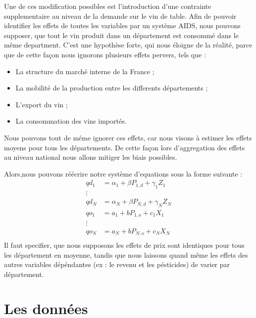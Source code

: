 \documentclass[11pt,]{article}
\begin{document}
\par

Une de ces modification possibles est l'introduction d'une contrainte
supplementaire au niveau de la demande sur le vin de table. Afin de
pouvoir identifier les effets de toutes les variables par un système
AIDS, nous pouvons supposer, que tout le vin produit dans un département
est consommé dans le même department. C'est une hypothèse forte, qui
nous éloigne de la réalité, parce que de cette façon nous ignorons
plusieurs effets pervers, tels que :

\begin{itemize}
  \item La structure du marché interne de la France ;
  \item La mobilité de la production entre les differents départements ;
  \item L'export du vin ;
  \item La consommation des vins importés.
\end{itemize}
\par

Nous pouvons tout de méme ignorer ces effets, car nous visons à estimer
les effets moyens pour tous les départements. De cette façon lors
d'aggregation des effets au niveau national nous allons mitiger les
biais possibles.

\par

Alors,nous pouvons réécrire notre système d'equations sous la forme
suivante : \begin{align*}
  qd_1 & = \alpha_{1} + \beta P_{1,d} + \gamma_{1} Z_{1} \\
  \vdots \\ 
  qd_N & = \alpha_{N} + \beta P_{N,d} + \gamma_{N} Z_{N} \\
  qo_1 & = a_1 + b P_{1,o} + c_1 X_{1} \\ 
  \vdots \\ 
  qo_N & = a_N + b P_{N,o} + c_N X_{N} \\
\end{align*} Il faut specifier, que nous supposons les effets de prix
sont identiques pour tous les département en moyenne, tandis que nous
laissons quand même les effets des autres variables dépéndantes (ex : le
revenu et les pésticides) de varier par département.

\hypertarget{les-donnees}{%
\section{Les données}\label{les-donnees}}
\end{document}
